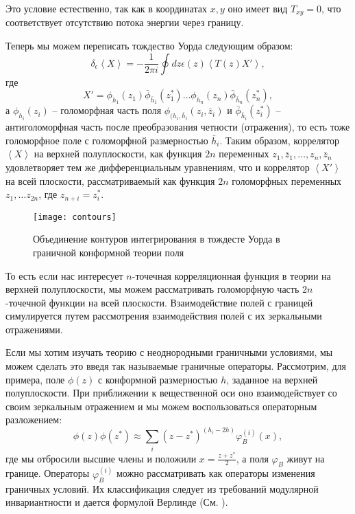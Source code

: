 Это условие естественно, так как в координатах $x,y$ оно имеет вид $T_{xy}=0$, что соответствует отсутствию потока энергии через границу. 

Теперь мы можем переписать тождество Уорда следующим образом:
\begin{equation}
  \label{eq:186}
  \delta_{\epsilon} \left< X\right> = -\frac{1}{2\pi i} \oint dz \epsilon(z) \left< T(z) X'\right>,
\end{equation}
где
\begin{equation}
  \label{eq:175}
  X'=\phi_{h_{1}}(z_{1}) \bar \phi_{\bar h_{1}}(z_{1}^{*}) \dots \phi_{h_{n}}(z_{n}) \bar \phi_{\bar h_{n}}(z_{n}^{*}), 
\end{equation}
а $\phi_{h_{i}}(z_{i})$ -- голоморфная часть поля $\phi_{(h_{i},\bar h_{i}}(z_{i},\bar z_{i})$ и $\bar\phi_{\bar h_{i}}(z_{i}^{*})$ -- антиголоморфная часть после преобразования четности (отражения), то есть тоже голоморфное поле с голоморфной размерностью $\bar h_{i}$. Таким образом, коррелятор $\left<X\right>$ на верхней полуплоскости, как функция $2n$ переменных $z_{1},\bar z_{1},\dots,z_{n},\bar z_{n}$ удовлетворяет тем же дифференциальным уравнениям, что и коррелятор $\left< X'\right>$ на всей плоскости, рассматриваемый как функция $2n$ голоморфных переменных $z_{1},\dots z_{2n}$, где $z_{n+i}=z_{i}^{*}$. 

\begin{figure}[h]
 \centering
  \texttt{[image: contours]}  
  \caption{Объединение контуров интегрирования в тождесте Уорда в граничной конформной теории поля}
  \label{fig:ward}
\end{figure}

То есть если нас интересует $n$-точечная корреляционная функция в теории на верхней полуплоскости, мы можем рассматривать голоморфную часть $2n$-точечной функции на всей плоскости. Взаимодействие полей с границей симулируется путем рассмотрения взаимодействия полей с их зеркальными отражениями. 

Если мы хотим изучать теорию с неоднородными граничными условиями, мы можем сделать это введя так называемые граничные операторы. Рассмотрим, для примера, поле $\phi(z)$  с конформной размерностью $h$, заданное на верхней полуплоскости. При приближении к вещественной оси оно взаимодействует со своим зеркальным отражением и мы можем воспользоваться операторным разложением:
\begin{equation}
  \label{eq:176}
  \phi(z)\phi(z^*)\approx \sum_i (z-z^*)^{(h_i -2h)}\varphi_B^{(i)}(x),
\end{equation}
где мы отбросили высшие члены и положили $x=\frac{z+z^*}{2}$, а поля $\varphi_B$ живут на границе. Операторы $\varphi_B^{(i)}$ можно рассматривать как операторы изменения граничных условий.  Их классификация следует из требований модулярной инвариантности и дается формулой Верлинде (См. \cite{cardy1989boundary,difrancesco1997cft}). 

